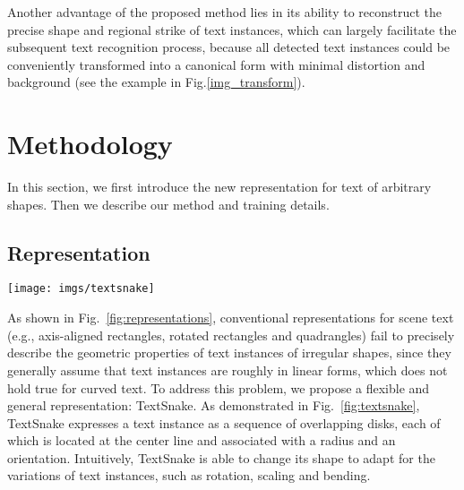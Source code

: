 \documentclass[runningheads]{llncs}
\begin{document}
Another advantage of the proposed method lies in its ability to reconstruct the precise shape and regional strike of text instances, which can largely facilitate the subsequent text recognition process, because all detected text instances could be conveniently transformed into a canonical form with minimal distortion and background (see the example in Fig.\ref{img_transform}).

\section{Methodology}
In this section, we first introduce the new representation for text of arbitrary shapes. Then we describe our method and training details.

\subsection{Representation} \label{sec:representation}


\begin{figure*}
\vspace{-6mm}
\begin{centering}
\texttt{[image: imgs/textsnake]}
\par\end{centering}
\vspace{-6mm}
\caption{Illustration of the proposed TextSnake representation. Text region (in yellow) is represented as a series of ordered disks (in blue), each of which is located at the center line (in green, a.k.a symmetric axis or skeleton) and associated with a radius  and an orientation . In contrast to conventional representations (e.g., axis-aligned rectangles, rotated rectangles and quadrangles), TextSnake is more flexible and general, since it can precisely describe text of different forms, regardless of shapes and lengths.}  \label{fig:textsnake}
\vspace{-5mm}
\end{figure*}

As shown in Fig.~\ref{fig:representations}, conventional representations for scene text (e.g., axis-aligned rectangles, rotated rectangles and quadrangles) fail to precisely describe the geometric properties of text instances of irregular shapes, since they generally assume that text instances are roughly in linear forms, which does not hold true for curved text. To address this problem, we propose a flexible and general representation: TextSnake. As demonstrated in Fig.~\ref{fig:textsnake}, TextSnake expresses a text instance as a sequence of overlapping disks, each of which is located at the center line and associated with a radius and an orientation. Intuitively, TextSnake is able to change its shape to adapt for the variations of text instances, such as rotation, scaling and bending.
\end{document}
